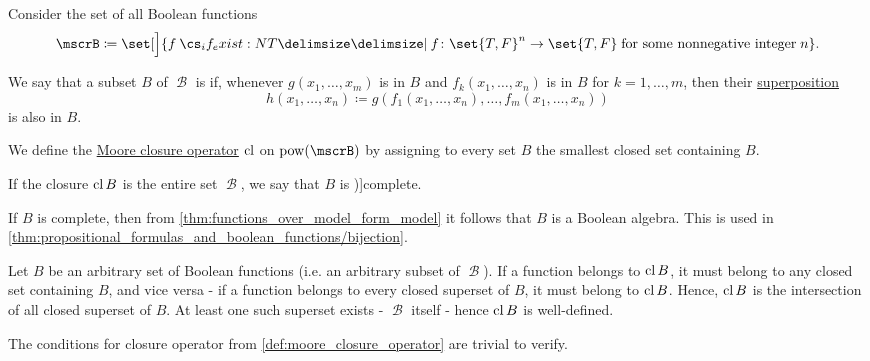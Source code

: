 \begin{definition}\label{def:boolean_closure}
  Consider the set of all Boolean functions
  \begin{equation*}
    \mscrB \coloneqq \set[\Big]{ f \given* f \colon \set{ T, F }^n \to \set{ T, F } \T{for some nonnegative integer} n }.
  \end{equation*}

  \begin{thmenum}
     We say that a subset \( B \) of \( \mscrB \) is  if, whenever \( g(x_1, \ldots, x_m) \) is in \( B \) and \( f_k(x_1, \ldots, x_n) \) is in \( B \) for \( k = 1, \ldots, m \), then their \hyperref[con:function_superposition]{superposition}
    \begin{equation*}
      h(x_1, \ldots, x_n) \coloneqq g(f_1(x_1, \ldots, x_n), \ldots, f_m(x_1, \ldots, x_n))
    \end{equation*}
    is also in \( B \).

     We define the \hyperref[def:moore_closure_operator]{Moore closure operator} \( \operatorname{cl} \) on \( \pow(\mscrB) \) by assigning to every set \( B \) the smallest closed set containing \( B \).

     If the closure \( \operatorname{cl}{B} \) is the entire set \( \mscrB \), we say that \( B \) is \term[ru=полная система, en=functionally complete (\cite[857]{Rosen2019DiscreteMathematics})]{complete}.
  \end{thmenum}
\end{definition}
\begin{comments}
  \item If \( B \) is complete, then from \cref{thm:functions_over_model_form_model} it follows that \( B \) is a Boolean algebra. This is used in \cref{thm:propositional_formulas_and_boolean_functions/bijection}.
\end{comments}
\begin{defproof}
  Let \( B \) be an arbitrary set of Boolean functions (i.e. an arbitrary subset of \( \mscrB \)). If a function belongs to \( \operatorname{cl}{B} \), it must belong to any closed set containing \( B \), and vice versa - if a function belongs to every closed superset of \( B \), it must belong to \( \operatorname{cl}{B} \). Hence, \( \operatorname{cl}{B} \) is the intersection of all closed superset of \( B \). At least one such superset exists - \( \mscrB \) itself - hence \( \operatorname{cl}{B} \) is well-defined.

  The conditions for closure operator from \cref{def:moore_closure_operator} are trivial to verify.
\end{defproof}


